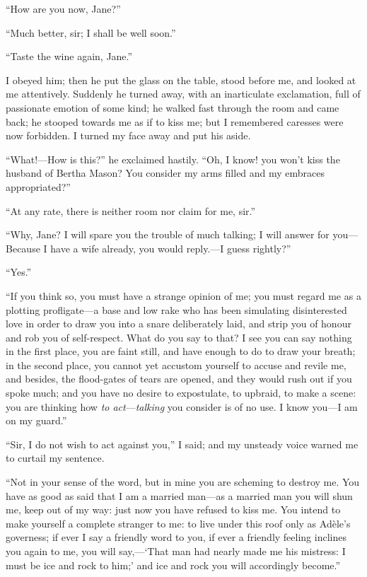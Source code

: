\enquote{How are you now, Jane?}

\enquote{Much better, sir; I shall be well soon.}

\enquote{Taste the wine again, Jane.}

I obeyed him; then he put the glass on the table, stood before me, and
looked at me attentively. Suddenly he turned away, with an inarticulate
exclamation, full of passionate emotion of some kind; he walked fast
through the room and came back; he stooped towards me as if to kiss me;
but I remembered caresses were now forbidden. I turned my face away and
put his aside.

\enquote{What!---How is this?} he exclaimed hastily. \enquote{Oh, I
know! you won't kiss the husband of Bertha Mason? You consider my arms
filled and my embraces appropriated?}

\enquote{At any rate, there is neither room nor claim for me, sir.}

\enquote{Why, Jane? I will spare you the trouble of much talking; I
will answer for you---Because I have a wife already, you would
reply.---I guess rightly?}

\enquote{Yes.}

\enquote{If you think so, you must have a strange opinion of me; you must
regard me as a plotting profligate---a base and low rake who has been
simulating disinterested love in order to draw you into a snare
deliberately laid, and strip you of honour and rob you of self-respect. 
What do you say to that? I see you can say nothing in the first place,
you are faint still, and have enough to do to draw your breath; in the
second place, you cannot yet accustom yourself to accuse and revile me,
and besides, the flood-gates of tears are opened, and they would rush
out if you spoke much; and you have no desire to expostulate, to
upbraid, to make a scene: you are thinking how \emph{to
act}---\emph{talking} you consider is of no use. I know you---I am on
my guard.}

\enquote{Sir, I do not wish to act against you,} I said; and my unsteady
voice warned me to curtail my sentence.

\enquote{Not in your sense of the word, but in mine you are scheming to
destroy me. You have as good as said that I am a married man---as a
married man you will shun me, keep out of my way: just now you have
refused to kiss me. You intend to make yourself a complete stranger to
me: to live under this roof only as Adèle's governess; if ever I say a
friendly word to you, if ever a friendly feeling inclines you again to
me, you will say,---\enquote{That man had nearly made me his mistress: I must be
ice and rock to him;} and ice and rock you will accordingly become.}

